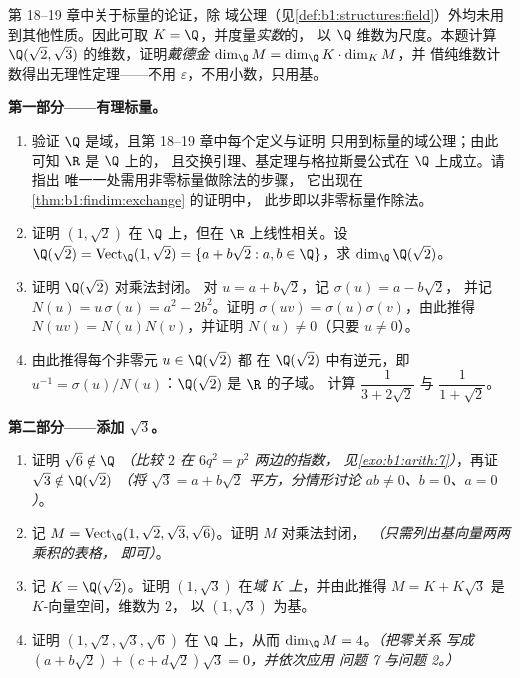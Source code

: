 \begin{problem}\label{pb:b1:findim:1}
第 18--19 章中关于标量的论证，除
域公理（见\cref{def:b1:structures:field}）外均未用到其他性质。因此可取
$K = \Q$，并度量\emph{实数}的，
以 $\Q$ 维数为尺度。本题计算
$\Q(\sqrt2, \sqrt3)$ 的维数，证明\emph{戴德金
} $\dim_\Q M = \dim_\Q K \cdot \dim_K M$，并
借纯维数计数得出无理性定理——不用
$\varepsilon$，不用小数，只用基。

\medskip
\noindent\textbf{第一部分——有理标量。}
\begin{enumerate}
  \item 验证 $\Q$ 是域，且第 18--19 章中每个定义与证明
        只用到标量的域公理；由此可知 $\R$ 是 $\Q$ 上的，
        且交换引理、基定理与格拉斯曼公式在 $\Q$ 上成立。请指出
        唯一一处需用非零标量做除法的步骤，
        它出现在
        \cref{thm:b1:findim:exchange} 的证明中，
        此步即以非零标量作除法。
  \item 证明 $(1, \sqrt2)$ 在 $\Q$ 上，但在
        $\R$ 上线性相关。设 $\Q(\sqrt2) = \operatorname{Vect}_\Q(1,
        \sqrt2) = \{a + b\sqrt2 : a, b \in \Q\}$，求
        $\dim_\Q \Q(\sqrt2)$。
  \item 证明 $\Q(\sqrt2)$ 对乘法封闭。
        对 $u = a + b\sqrt2$，记 $\sigma(u) = a - b\sqrt2$，
        并记 $N(u) = u\,\sigma(u) = a^2 - 2b^2$。证明 $\sigma(uv) =
        \sigma(u)\sigma(v)$，由此推得 $N(uv) = N(u)N(v)$，并证明
        $N(u) \neq 0$（只要 $u \neq 0$）。
  \item 由此推得每个非零元 $u \in \Q(\sqrt2)$ 都
        在 $\Q(\sqrt2)$ 中有逆元，即 $u^{-1} =
        \sigma(u)/N(u)$：$\Q(\sqrt2)$ 是 $\R$ 的子域。
        计算 $\dfrac1{3 + 2\sqrt2}$ 与 $\dfrac1{1 + \sqrt2}$。
\end{enumerate}

\medskip
\noindent\textbf{第二部分——添加 $\sqrt3$。}
\begin{enumerate}[resume]
  \item 证明 $\sqrt6 \notin \Q$ \emph{（比较 $2$ 在
        $6q^2 = p^2$ 两边的指数，
        见\cref{exo:b1:arith:7}）}，再证 $\sqrt3 \notin
        \Q(\sqrt2)$ \emph{（将 $\sqrt3 = a + b\sqrt2$ 平方，分情形讨论
        $ab \neq 0$、$b = 0$、$a = 0$）}。
  \item 记 $M = \operatorname{Vect}_\Q(1, \sqrt2, \sqrt3,
        \sqrt6)$。证明 $M$ 对乘法封闭，
        \emph{（只需列出基向量两两乘积的表格，
        即可）}。
  \item 记 $K = \Q(\sqrt2)$。证明 $(1, \sqrt3)$
        在\emph{域 $K$ 上}，并由此推得 $M = K +
        K\sqrt3$ 是 $K$-向量空间，维数为 $2$，
        以 $(1, \sqrt3)$ 为基。
  \item 证明 $(1, \sqrt2, \sqrt3, \sqrt6)$ 在
        $\Q$ 上，从而 $\dim_\Q M = 4$。\emph{（把零关系
        写成 $(a + b\sqrt2) + (c + d\sqrt2)\sqrt3 = 0$，并依次应用
        问题 7 与问题 2。）}
\end{enumerate}


\end{problem}
